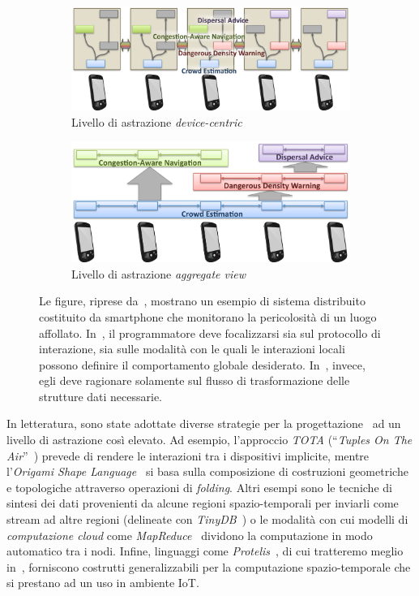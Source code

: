 \begin{figure}[htbp]
  \begin{subfigure}{.95\textwidth}
    \centering
    \includegraphics[width=.6\textwidth]{res/fig/device-centric.png}
    \caption{Livello di astrazione \emph{device-centric}}%
    \label{fig:device-centric}
  \end{subfigure}
  \newline
  \begin{subfigure}{.95\textwidth}
    \centering
    \includegraphics[width=.6\textwidth]{res/fig/aggregate.png}
    \caption{Livello di astrazione \emph{aggregate view}}%
    \label{fig:aggregate}
  \end{subfigure}
  \caption[%
    Esempio di sistema distribuito
  ]{%
    Le figure, riprese da~\cite{7274429}, mostrano un esempio di sistema distribuito costituito da smartphone che monitorano la pericolosità di un luogo affollato.
    In~, il programmatore deve focalizzarsi sia sul protocollo di interazione, sia sulle modalità con le quali le interazioni locali possono definire il comportamento globale desiderato.
    In~, invece, egli deve ragionare solamente sul flusso di trasformazione delle strutture dati necessarie.
  }%
  \label{fig:pov}
\end{figure}

In letteratura, sono state adottate diverse strategie per la progettazione~\cite{7274429} ad un livello di astrazione così elevato.
Ad esempio, l'approccio \emph{TOTA} (``\emph{Tuples On The Air}''~\cite{10.1145/1538942.1538945}) prevede di rendere le interazioni tra i dispositivi implicite,
mentre l'\emph{Origami Shape Language}~\cite{nagpal2001programmable} si basa sulla composizione di costruzioni geometriche e topologiche attraverso operazioni di \emph{folding}.
Altri esempi sono le tecniche di sintesi dei dati provenienti da alcune regioni spazio-temporali per inviarli come stream ad altre regioni (delineate con \emph{TinyDB}~\cite{1017485})
o le modalità con cui modelli di \emph{computazione cloud} come \emph{MapReduce}~\cite{10.1145/1327452.1327492} dividono la computazione in modo automatico tra i nodi.
Infine, linguaggi come \emph{Protelis}~\cite{PianiniSASOTutorial2017}, di cui tratteremo meglio in~, forniscono costrutti generalizzabili per la computazione spazio-temporale che si prestano ad un uso in ambiente IoT.

